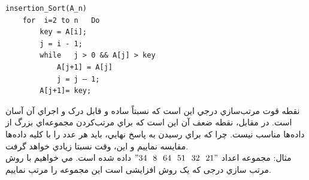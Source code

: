 \documentclass{book}
\begin{document}
\begin{LTR}
	\begin{Verbatim}[tabsize=0]
	insertion_Sort(A_n)
	for  i=2 to n   Do
	    key = A[i];
	    j = i - 1;
	    while   j > 0 && A[j] > key
	        A[j+1] = A[j]
	        j = j – 1;
	    A[j+1]= key;
	\end{Verbatim}
\end{LTR}
	نقطه قوت مرتب‌سازي درجي اين است كه نسبتاً ساده و قابل درک و اجراي آن آسان است. در مقابل، نقطه ضعف آن اين است كه براي مرتب‌کردن مجموعه‌اي بزرگ از داده‌ها مناسب نيست. چرا که براي رسيدن به پاسخ نهايي، بايد هر عدد را با  کليه داده‌ها مقايسه نماييم و اين، وقت نسبتا زيادي خواهد گرفت. \\
	مثال: مجموعه اعداد
	$"34 \hspace*{0.25cm} 8 \hspace*{0.25cm}  64 \hspace*{0.25cm}  51 \hspace*{0.25cm}  32 \hspace*{0.25cm} 21"$
	 داده شده است. مي خواهيم با روش مرتب سازي درجی که يک روش افزايشی است اين مجموعه را مرتب نماييم.
\end{document}

